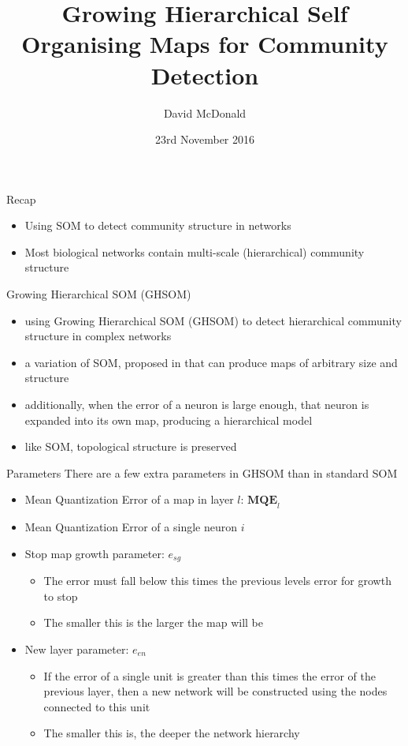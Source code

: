 \documentclass{beamer}
\title[GHSOM for Community Detection]{Growing Hierarchical Self Organising Maps for Community Detection}
\author{David McDonald}
\institute{University of Birmingham}
\date{23rd November 2016}
\begin{document}
	
	\begin{frame}
		\titlepage
	\end{frame}

	\begin{frame}{Recap}
		\begin{itemize}
			\item Using SOM to detect community structure in networks
			\item Most biological networks contain multi-scale (hierarchical) community structure 
		\end{itemize}
	\end{frame}

	\begin{frame}{Growing Hierarchical SOM (GHSOM)}
		\begin{itemize}
		\item using Growing Hierarchical SOM (GHSOM) to detect hierarchical community structure in complex networks 
		\item a variation of SOM, proposed in \cite{rauber2002growing} that can produce maps of arbitrary size and structure
		\item additionally, when the error of a neuron is large enough, that neuron is expanded into its own map, producing a hierarchical model
		\item like SOM, topological structure is preserved
		\end{itemize}
	\end{frame}

	\begin{frame}{Parameters}
	There are a few extra parameters in GHSOM than in standard SOM
		\begin{itemize}
			\item Mean Quantization Error of a map in layer $l$: $\textbf{MQE}_l$
			\item Mean Quantization Error of a single neuron $i$
			\item Stop map growth parameter: $e_{sg}$
			\begin{itemize}
				\item The error must fall below this times the previous levels error for growth to stop
				\item The smaller this is the larger the map will be
			\end{itemize}
			\item New layer parameter: $e_{en}$
			\begin{itemize}
				\item If the error of a single unit is greater than this times the error of the previous layer, then a new network will be constructed using the nodes connected to this unit
				\item The smaller this is, the deeper the network hierarchy
			\end{itemize}
		\end{itemize}
	\end{frame}
\end{document}
